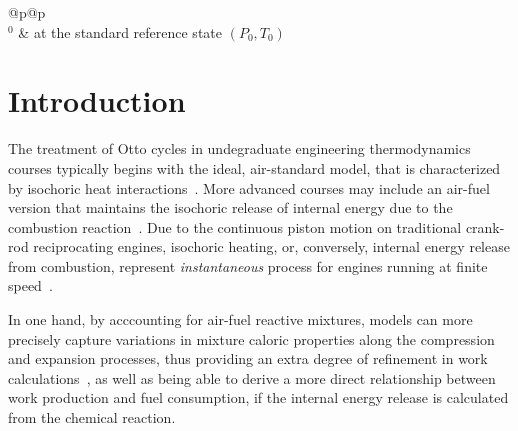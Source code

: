\par\noindent\begin{supertabular}{@{}p{\lensymb}@{}p{\lenWHAT}}                                                       
     \\                                                                       
    ${}^0$                  & at the standard reference state $(P_0, T_0)$                                                  \\
\end{supertabular}



\section{Introduction}

    The treatment of  Otto  cycles  in  undegraduate  engineering  thermodynamics  courses  typically  begins  with  the  ideal,
    air-standard  model,  that  is  characterized   by   isochoric   heat   interactions~\cite{2014-CengelYA+BolesMA-McGrawHill,
    2002-MoranMJ+ShapiroHN-LTC, 1985-WylenG-Wiley, 2015-KroosKA+PotterMC-Cengage}. More advanced courses may include an air-fuel
    version    that    maintains    the    isochoric    release    of    internal    energy    due     to     the     combustion
    reaction~\cite{2012-BrunettiF-Blucher}. Due to the continuous piston motion on traditional crank-rod reciprocating  engines,
    isochoric heating, or, conversely, internal energy release  from  combustion,  represent  \emph{instantaneous}  process  for
    engines running at finite speed~\cite{2017-NaaktgeborenC-IntJMechEngEduc}.

    In one hand, by acccounting for air-fuel reactive mixtures, models can more precisely capture variations in mixture  caloric
    properties along  the  compression  and  expansion  processes,  thus  providing  an  extra  degree  of  refinement  in  work
    calculations~\cite{2012-BrunettiF-Blucher}, as well as being  able  to  derive  a  more  direct  relationship  between  work
    production and fuel consumption, if the internal energy release is calculated from the chemical reaction.

